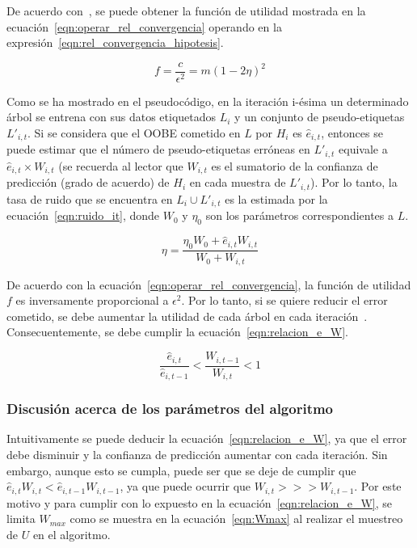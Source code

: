 De acuerdo con~\cite{zhou2021SemisupervisedRecommendationAttack}, se puede obtener la función de utilidad mostrada en la ecuación~\ref{eqn:operar_rel_convergencia} operando en la expresión~\ref{eqn:rel_convergencia_hipotesis}.

\begin{equation}\label{eqn:operar_rel_convergencia} f = \frac{c}{\epsilon^{2}} = m(1-2\eta)^{2} \end{equation} 

Como se ha mostrado en el pseudocódigo, en la iteración i-ésima un determinado árbol se entrena con sus datos etiquetados $L_{i}$ y un conjunto de pseudo-etiquetas $L'_{i,t}$. Si se considera que el OOBE cometido en $L$ por $H_{i}$ es $\hat{e}_{i,t}$, entonces se puede estimar que el número de pseudo-etiquetas erróneas en $L'_{i,t}$ equivale a $\hat{e}_{i,t} \times W_{i,t}$ (se recuerda al lector que $W_{i,t}$ es el sumatorio de la confianza de predicción (grado de acuerdo) de $H_{i}$ en cada muestra de $L'_{i,t}$). Por lo tanto, la tasa de ruido que se encuentra en $L_{i} \cup L'_{i,t}$ es la estimada por la ecuación~\ref{eqn:ruido_it}, donde $W_0$ y $\eta_0$ son los parámetros correspondientes a $L$. 

\begin{equation}\label{eqn:ruido_it} \eta = \frac{\eta_{0}W_{0} + \hat{e}_{i,t}W_{i,t}}{W_{0} + W_{i,t}} \end{equation} 

De acuerdo con la ecuación~\ref{eqn:operar_rel_convergencia}, la función de utilidad $f$ es inversamente proporcional a $\epsilon^2$. Por lo tanto, si se quiere reducir el error cometido, se debe aumentar la utilidad de cada árbol en cada iteración~\cite{zhou2021SemisupervisedRecommendationAttack}. Consecuentemente, se debe cumplir la ecuación~\ref{eqn:relacion_e_W}. 

\begin{equation}\label{eqn:relacion_e_W} \frac{\hat{e}_{i,t}}{\widehat{e}_{i, t-1}} < \frac{W_{i,t-1}}{W_{i,t}} < 1 \end{equation} 


\subsubsection{Discusión acerca de los parámetros del algoritmo}
\label{s:discusion-paramentros-cof}
Intuitivamente se puede deducir la ecuación~\ref{eqn:relacion_e_W}, ya que el error debe disminuir y la confianza de predicción aumentar con cada iteración. Sin embargo, aunque esto se cumpla, puede ser que se deje de cumplir que $\hat{e}_{i,t}W_{i,t} < \hat{e}_{i,t-1}W_{i,t-1}$, ya que puede ocurrir que $ W_{i,t} >>> W_{i,t-1}$. Por este motivo y para cumplir con lo expuesto en la ecuación~\ref{eqn:relacion_e_W}, se limita $W_{max}$ como se muestra en la ecuación~\ref{eqn:Wmax} al realizar el muestreo de $U$ en el algoritmo.

